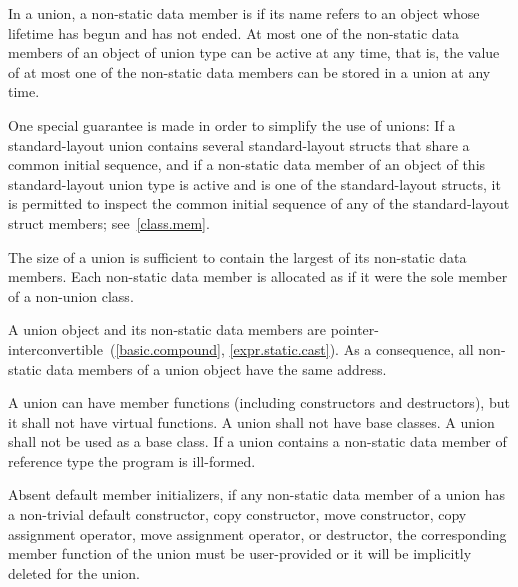 \pnum
In a union,
a non-static data member is 
if its name refers to an object
whose lifetime has begun and has not ended.
At most one of the non-static data members of an object of union type
can be active at any
time, that is, the value of at most one of the non-static data members can be
stored in a union at any time.
\begin{note}
One special guarantee is made in order to
simplify the use of unions: If a standard-layout union contains several standard-layout
structs that share a common initial sequence, and
if a non-static data member of an object of this standard-layout union type
is active and is one of the standard-layout structs,
it is permitted to inspect the common initial sequence
of any of the standard-layout struct members;
see~\ref{class.mem}.
\end{note}

\pnum
The size of a union is sufficient to contain the largest
of its non-static data members. Each non-static data member is allocated
as if it were the sole member of a non-union class.
\begin{note}
A union object and its non-static data members are
pointer-interconvertible~(\ref{basic.compound}, \ref{expr.static.cast}).
As a consequence, all non-static data members of a
union object have the same address.
\end{note}

\pnum
{}%
%
%
A union can have member functions (including constructors and destructors),
%
but it shall not have virtual functions. A union shall not have
base classes. A union shall not be used as a base class.
%
If a union contains a non-static data member of
reference type the program is ill-formed.
\begin{note}
Absent default member initializers,
if any non-static data member of a union has a non-trivial
default constructor,
copy constructor, move constructor,
copy assignment operator, move assignment operator,
or destructor, the corresponding member function
of the union must be user-provided or it will
be implicitly deleted for the union.
\end{note}

